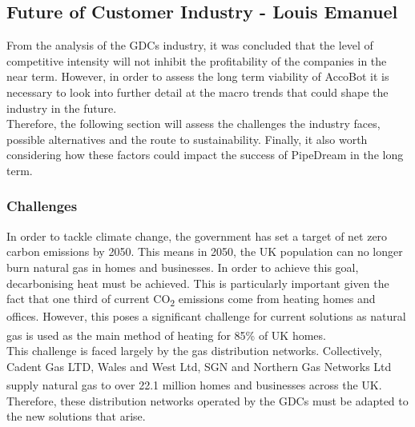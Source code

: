 \documentclass[11pt]{article}		%
\newcommand{\supercite}[1]{\textsuperscript{\cite{#1}}}		%
\newcommand{\sectref}[1]{\hyperref[#1]{Section \ref*{#1}}}     %
\begin{document}
                
        
        \subsection[Future of Customer Industry]{Future of Customer Industry - Louis Emanuel} \label{customerFuture}
            
    		From the analysis of the GDCs industry, it was concluded that the level of competitive intensity will not inhibit the profitability of the companies in the near term. However, in order to assess the long term viability of AccoBot it is necessary to look into further detail at the macro trends that could shape the industry in the future.
    		\\
    	    \hspace*{2ex}Therefore, the following section will assess the challenges the industry faces, possible alternatives and the route to sustainability. Finally, it also worth considering how these factors could impact the success of PipeDream in the long term. 
    	    
    	    \subsubsection[Challenges]{Challenges}
    	    
            In order to tackle climate change, the government has set a target of net zero carbon emissions by 2050. This means in 2050, the UK population can no longer burn natural gas in homes and businesses. In order to achieve this goal, decarbonising heat must be achieved. This is particularly important given the fact that one third of current CO\textsubscript{2} emissions come from heating homes and offices. However, this poses a significant challenge for current solutions as natural gas is used as the main method of heating for 85\% of UK homes\supercite{85gas}.
            \\
            \hspace*{2ex}This challenge is faced largely by the gas distribution networks. Collectively, Cadent Gas LTD, Wales and West Ltd, SGN and Northern Gas Networks Ltd supply natural gas to over 22.1 million homes and businesses across the UK\supercite{supplied}. Therefore, these distribution networks operated by the GDCs must be adapted to the new solutions that arise. 
    
\end{document}
